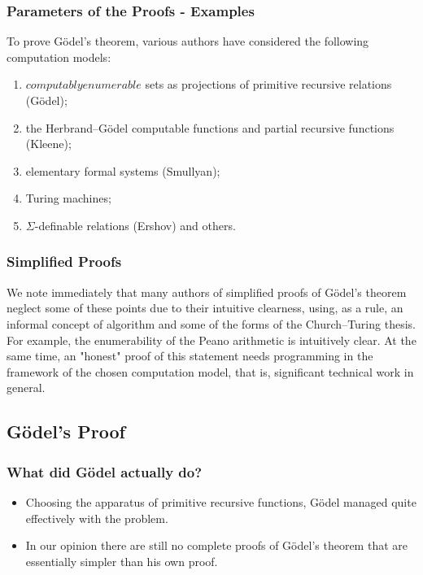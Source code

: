 \documentclass[aspectratio=169]{beamer}
\begin{document}
\begin{frame}
	\frametitle{Parameters of the Proofs - Examples}
	To prove Gödel’s theorem, various authors have considered the following computation models: \\
	\begin{enumerate}
		\item $computably enumerable$ sets as projections of primitive recursive relations (Gödel);
		\item the Herbrand–Gödel computable functions and partial recursive functions (Kleene);
		\item elementary formal systems (Smullyan);
		\item Turing machines;
		\item $\Sigma$-definable relations (Ershov) and others.
	\end{enumerate}
	\begin{flushright}
		\cite{bekl}
	\end{flushright}
\end{frame}

\begin{frame}
	\frametitle{Simplified Proofs}
	We note immediately that many authors of simplified proofs of Gödel's theorem neglect some of these points due to their intuitive clearness, using, as a rule, an informal concept of algorithm and some of the forms of the Church–Turing thesis. For example, the enumerability of the Peano arithmetic is intuitively clear. At the same time, an "honest" proof of this statement needs programming in the framework of the chosen computation model, that is, significant technical work in general.
	\begin{flushright}
		\cite{bekl}
	\end{flushright}
\end{frame}

\subsection{Gödel's Proof}
\begin{frame}
	\frametitle{What did Gödel actually do?}
	\begin{itemize}
		\item Choosing the apparatus of primitive recursive functions, Gödel managed quite effectively with the problem.
		\item In our opinion there are still no complete proofs of Gödel’s theorem that are essentially simpler than his own proof.
	\end{itemize}
	\begin{flushright}
		\cite{bekl}
	\end{flushright}
\end{frame}
\end{document}
